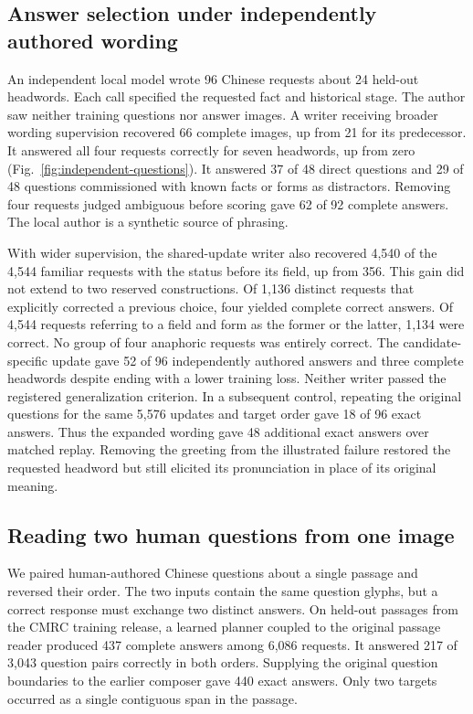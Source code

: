 \documentclass[12pt,a4paper]{article}
\providecommand{\DIFadd}[1]{{\protect\color{blue} \sf #1}} %
\begin{document}
\subsection*{\DIFadd{Answer selection under independently authored wording}}
\DIFadd{An independent local model wrote 96 Chinese requests about 24 held-out headwords. Each call specified the requested fact and historical stage. The author saw neither training questions nor answer images. A writer receiving broader wording supervision recovered 66 complete images, up from 21 for its predecessor. It answered all four requests correctly for seven headwords, up from zero (Fig.~\ref{fig:independent-questions}). It answered 37 of 48 direct questions and 29 of 48 questions commissioned with known facts or forms as distractors. Removing four requests judged ambiguous before scoring gave 62 of 92 complete answers. The local author is a synthetic source of phrasing.
}

\DIFadd{With wider supervision, the shared-update writer also recovered 4,540 of the 4,544 familiar requests with the status before its field, up from 356. This gain did not extend to two reserved constructions. Of 1,136 distinct requests that explicitly corrected a previous choice, four yielded complete correct answers. Of 4,544 requests referring to a field and form as the former or the latter, 1,134 were correct. No group of four anaphoric requests was entirely correct. The candidate-specific update gave 52 of 96 independently authored answers and three complete headwords despite ending with a lower training loss. Neither writer passed the registered generalization criterion. In a subsequent control, repeating the original questions for the same 5,576 updates and target order gave 18 of 96 exact answers. Thus the expanded wording gave 48 additional exact answers over matched replay. Removing the greeting from the illustrated failure restored the requested headword but still elicited its pronunciation in place of its original meaning.
}

\subsection*{\DIFadd{Reading two human questions from one image}}
\DIFadd{We paired human-authored Chinese questions about a single passage and reversed their order. The two inputs contain the same question glyphs, but a correct response must exchange two distinct answers. On held-out passages from the CMRC training release, a learned planner coupled to the original passage reader produced 437 complete answers among 6,086 requests. It answered 217 of 3,043 question pairs correctly in both orders. Supplying the original question boundaries to the earlier composer gave 440 exact answers. Only two targets occurred as a single contiguous span in the passage.
}
\end{document}
